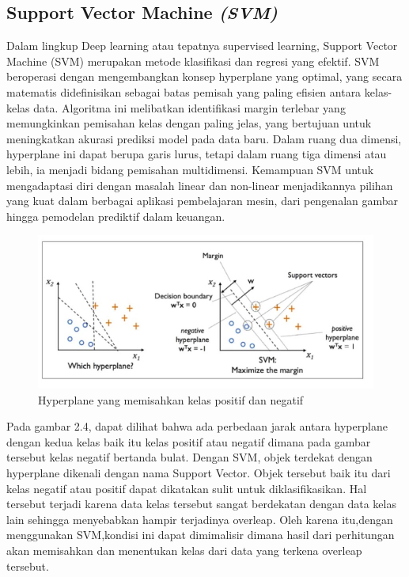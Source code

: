 \subsection{Support Vector Machine \emph{(SVM)}}
\label{subsec:SVM}

Dalam lingkup Deep learning atau tepatnya supervised learning, Support Vector Machine (SVM) merupakan metode klasifikasi dan regresi yang efektif. SVM beroperasi dengan mengembangkan konsep hyperplane yang optimal, yang secara matematis didefinisikan sebagai batas pemisah yang paling efisien antara kelas-kelas data. Algoritma ini melibatkan identifikasi margin terlebar yang memungkinkan pemisahan kelas dengan paling jelas, yang bertujuan untuk meningkatkan akurasi prediksi model pada data baru. Dalam ruang dua dimensi, hyperplane ini dapat berupa garis lurus, tetapi dalam ruang tiga dimensi atau lebih, ia menjadi bidang pemisahan multidimensi. Kemampuan SVM untuk mengadaptasi diri dengan masalah linear dan non-linear menjadikannya pilihan yang kuat dalam berbagai aplikasi pembelajaran mesin, dari pengenalan gambar hingga pemodelan prediktif dalam keuangan.  

\begin{figure} [H] \centering
  \includegraphics[scale=0.7]{gambar/2_2_6.jpg}
  \caption{Hyperplane yang memisahkan kelas positif dan negatif}
  \label{fig:SVM}
\end{figure}

Pada gambar 2.4, dapat dilihat bahwa ada perbedaan jarak antara hyperplane dengan kedua kelas baik itu kelas positif atau negatif dimana pada gambar tersebut kelas negatif bertanda bulat. Dengan SVM, objek terdekat dengan hyperplane dikenali dengan nama Support Vector. Objek tersebut baik itu dari kelas negatif atau positif dapat dikatakan sulit untuk diklasifikasikan. Hal tersebut terjadi karena data kelas tersebut sangat berdekatan dengan data kelas lain sehingga menyebabkan hampir terjadinya overleap\parencite{tan2018research}. Oleh karena itu,dengan menggunakan SVM,kondisi ini dapat dimimalisir dimana hasil dari perhitungan akan memisahkan dan menentukan kelas dari data yang terkena overleap tersebut.


